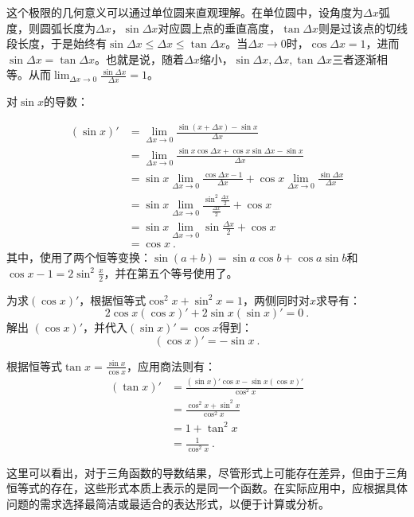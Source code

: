 这个极限的几何意义可以通过单位圆来直观理解。在单位圆中，设角度为$\Delta x$弧度，则圆弧长度为$\Delta x$，$\sin\Delta x$对应圆上点的垂直高度，$\tan\Delta x$则是过该点的切线段长度，于是始终有$\sin\Delta x \leq \Delta x \leq \tan\Delta x$。当$\Delta x \to 0$时，$\cos \Delta x=1$，进而$\sin\Delta x=\tan\Delta x$。也就是说，随着$\Delta x$缩小，$\sin\Delta x,\Delta x,\tan\Delta x$三者逐渐相等。从而$\displaystyle\lim_{\Delta x \to 0} \frac{\sin\Delta x}{\Delta x} = 1$。

对$\sin x$的导数：

\begin{equation}
\begin{split}
\left(\sin x\right)' &= \lim_{\Delta x \to 0}\frac{\sin (x+\Delta x)-\sin x}{\Delta x} \\
&= \lim_{\Delta x \to 0}\frac{\sin x\cos\Delta x+\cos x\sin\Delta x-\sin x}{\Delta x} \\
&= \sin x\lim_{\Delta x \to 0}\frac{\cos\Delta x-1}{\Delta x}+\cos x\lim_{\Delta x \to 0}\frac{\sin\Delta x} {\Delta x}\\
&= \sin x\lim_{\Delta x \to 0}\frac{\sin^2\frac{\Delta x}{2}}{\frac{\Delta x}{2}}+\cos x\\
&= \sin x\lim_{\Delta x \to 0}\sin\frac{\Delta x}{2}+\cos x\\
&=\cos x~.
\end{split}
\end{equation}
其中，使用了两个恒等变换：$\sin (a+b)=\sin a\cos b+\cos a\sin b$和$\displaystyle\cos x-1=2\sin^2\frac{x}{2}$，并在第五个等号使用了。

为求$(\cos x)'$，根据恒等式$\cos^2 x+\sin^2 x=1$，两侧同时对$x$求导有：
\begin{equation}
2\cos x(\cos x)'+2\sin x(\sin x)'=0~.
\end{equation}
解出 $(\cos x)'$，并代入$(\sin x)'=\cos x$得到：
\begin{equation}
(\cos x)'=-\sin x~.
\end{equation}

根据恒等式$\displaystyle\tan x=\frac{\sin x}{\cos x}$，应用商法则有：
\begin{equation}
\begin{split}
(\tan x)'&=\frac{(\sin x)'\cos x-\sin x(\cos x)'}{\cos^2 x}\\
&=\frac{\cos^2 x+\sin^2 x}{\cos^2 x}\\
&=1+\tan^2 x\\
&=\frac{1}{\cos^2 x}~.
\end{split}
\end{equation}

这里可以看出，对于三角函数的导数结果，尽管形式上可能存在差异，但由于三角恒等式的存在，这些形式本质上表示的是同一个函数。在实际应用中，应根据具体问题的需求选择最简洁或最适合的表达形式，以便于计算或分析。